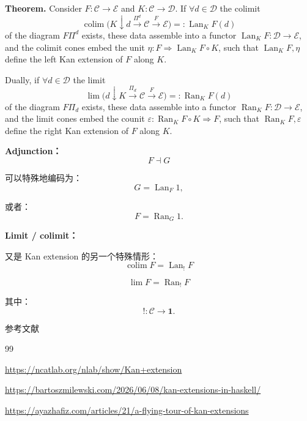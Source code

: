 \documentclass{beamer}
\begin{document}
\begin{frame}[fragile]
\textbf{Theorem.} Consider $F\colon\mathcal{C}\to\mathcal{E}$ and $K\colon\mathcal{C}\to\mathcal{D}$. If $\forall d\in\mathcal{D}$ the colimit
\[
\operatorname{colim}\bigl(K\downarrow d\xrightarrow{\Pi^d}\mathcal{C}\xrightarrow{F}\mathcal{E}\bigr)=:\operatorname{Lan}_K F(d)
\]
of the diagram $F\Pi^d$ exists, these data assemble into a functor $\operatorname{Lan}_K F\colon\mathcal{D}\to\mathcal{E}$, and the colimit cones embed the unit $\eta\colon F\Rightarrow\operatorname{Lan}_K F\circ K$, such that $\operatorname{Lan}_K F,\eta$ define the left Kan extension of $F$ along $K$.

Dually, if $\forall d\in\mathcal{D}$ the limit
\[
\lim\bigl(d\downarrow K\xrightarrow{\Pi_d}\mathcal{C}\xrightarrow{F}\mathcal{E}\bigr)=:\operatorname{Ran}_K F(d)
\]
of the diagram $F\Pi_d$ exists, these data assemble into a functor $\operatorname{Ran}_K F\colon\mathcal{D}\to\mathcal{E}$, and the limit cones embed the counit $\varepsilon\colon\operatorname{Ran}_K F\circ K\Rightarrow F$, such that $\operatorname{Ran}_K F,\varepsilon$ define the right Kan extension of $F$ along $K$.
\end{frame}

\begin{frame}[fragile]{}
\textbf{Adjunction：}
$$
F\dashv G
$$

可以特殊地编码为：
$$
G=\operatorname{Lan}_F1,
$$

或者：
$$
F=\operatorname{Ran}_G1.
$$

\textbf{Limit / colimit：}

又是 Kan extension 的另一个特殊情形：
$$
\boxed{
\operatorname{colim}F
=
\operatorname{Lan}_{!}F
}
$$

$$
\boxed{
\operatorname{lim}F
=
\operatorname{Ran}_{!}F
}
$$

其中：
$$
!:\mathcal C\to\mathbf 1.
$$
\end{frame}

\begin{frame}[allowframebreaks]{参考文献}
\begin{thebibliography}{99}

\url{https://ncatlab.org/nlab/show/Kan+extension}

\url{https://bartoszmilewski.com/2026/06/08/kan-extensions-in-haskell/}

\url{https://ayazhafiz.com/articles/21/a-flying-tour-of-kan-extensions}

\end{thebibliography}
\end{frame}
\end{document}
